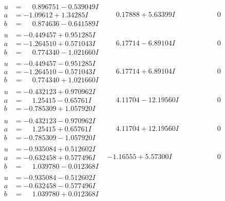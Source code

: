 \documentclass[1p]{elsarticle_modified}
\theoremstyle{definition}
\begin{document}
$$\begin{array}{c|c|c}
\begin{aligned}
u &= \phantom{-}0.896751 - 0.539049 I \\
a &= -1.09612 + 1.34285 I \\
b &= \phantom{-}0.874636 - 0.641589 I\end{aligned}
 & \phantom{-}0.17888 + 5.63399 I & \phantom{-0.000000 } 0 \\ \hline\begin{aligned}
u &= -0.449457 + 0.951285 I \\
a &= -1.264510 + 0.571043 I \\
b &= \phantom{-}0.774340 - 1.021660 I\end{aligned}
 & \phantom{-}6.17714 - 6.89104 I & \phantom{-0.000000 } 0 \\ \hline\begin{aligned}
u &= -0.449457 - 0.951285 I \\
a &= -1.264510 - 0.571043 I \\
b &= \phantom{-}0.774340 + 1.021660 I\end{aligned}
 & \phantom{-}6.17714 + 6.89104 I & \phantom{-0.000000 } 0 \\ \hline\begin{aligned}
u &= -0.432123 + 0.970962 I \\
a &= \phantom{-}1.25415 - 0.65761 I \\
b &= -0.785309 + 1.057920 I\end{aligned}
 & \phantom{-}4.11704 - 12.19560 I & \phantom{-0.000000 } 0 \\ \hline\begin{aligned}
u &= -0.432123 - 0.970962 I \\
a &= \phantom{-}1.25415 + 0.65761 I \\
b &= -0.785309 - 1.057920 I\end{aligned}
 & \phantom{-}4.11704 + 12.19560 I & \phantom{-0.000000 } 0 \\ \hline\begin{aligned}
u &= -0.935084 + 0.512602 I \\
a &= -0.632458 + 0.577496 I \\
b &= \phantom{-}1.039780 - 0.012368 I\end{aligned}
 & -1.16555 + 5.57300 I & \phantom{-0.000000 } 0 \\ \hline\begin{aligned}
u &= -0.935084 - 0.512602 I \\
a &= -0.632458 - 0.577496 I \\
b &= \phantom{-}1.039780 + 0.012368 I\end{aligned}

\end{array}$$
\end{document}
